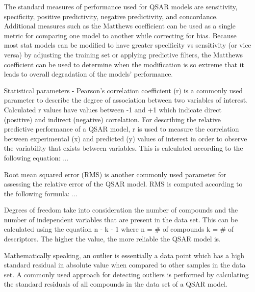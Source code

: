The standard measures of performance used for QSAR models are sensitivity, specificity, positive predictivity, negative predictivity, and concordance. Additional measures such as the Matthews coefficient can be used as a single metric for comparing one model to another while correcting for bias. Because most stat models can be modified to have greater specificity vs sensitivity (or vice versa) by adjusting the training set or applying predictive filters, the Matthews coefficient can be used to determine when the modification is so extreme that it leads to overall degradation of the models’ performance.\cite{Kruhlak2012}

Statistical parameters - Pearson's correlation coefficient (r) is a commonly used parameter to describe the degree of association between two variables of interest. Calculated r values have values between -1 and +1 which indicate direct (positive) and indirect (negative) correlation. For describing the relative predictive performance of a QSAR model, r is used to measure the correlation between experimental (x) and predicted (y) values of interest in order to observe the variability that exists between variables. This is calculated according to the following equation: ...

Root mean squared error (RMS) is another commonly used parameter for assessing the relative error of the QSAR model. RMS is computed according to the following formula: ...


Degrees of freedom take into consideration the number of compounds and the number of independent variables that are present in the data set. This can be calculated using the equation n - k - 1 where n = \# of compounds k = \# of descriptors. The higher the value, the more reliable the QSAR model is. \cite{Nantasenamat2009}

Mathematically speaking, an outlier is essentially a data point which has a high standard residual in absolute value when compared to other samples in the data set. A commonly used approach for detecting outliers is performed by calculating the standard residuals of all compounds in the data set of a QSAR model. \cite{Nantasenamat2009}




